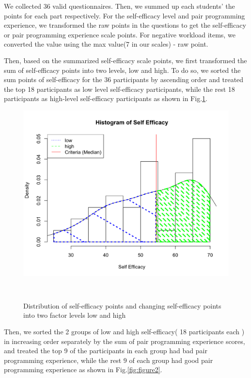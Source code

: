 \documentclass{sigchi}
\begin{document}
We collected 36 valid questionnaires. Then, we summed up each students' the points for each part respectively. For the self-efficacy level and pair programming experience, we transformed the raw points in the questions to get the self-efficacy or pair programming experience scale points. For negative workload items, we converted the value using the max value(7 in our scales) - raw point. 

Then, based on the summarized self-efficacy scale points, we first transformed the sum of self-efficacy points into two levels, low and high. To do so, we sorted the sum points of self-efficacy for the 36 participants by ascending order and treated the top 18 participants as low level self-efficacy participants, while the rest 18 participants as high-level self-efficacy participants as shown in Fig.\ref{fig:figure1}.

\begin{figure}
\centering
  \includegraphics[width=0.6\columnwidth]{figures/hist1}
  \caption{Distribution of self-efficacy points and changing self-efficacy points into two factor levels low and high }~\label{fig:figure1}
\end{figure}

Then, we sorted the 2 groups of low and high self-efficacy( 18 participants each ) in increasing order separately by the sum of pair programming experience scores, and treated the top 9 of the participants in each group had bad pair programming experience, while the rest 9 of each group had good pair programming experience as shown in Fig.\ref{fig:figure2}. 
\end{document}
